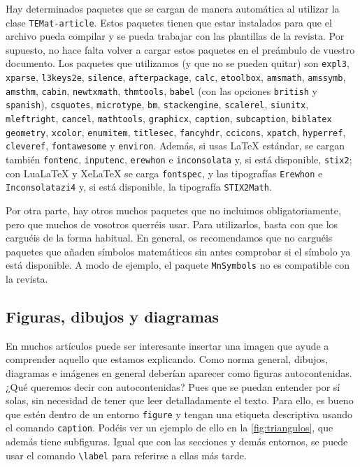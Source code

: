 \documentclass{TEMat-article}
\begin{document}
Hay determinados paquetes que se cargan de manera automática al utilizar la clase \verb+TEMat-article+.
Estos paquetes tienen que estar instalados para que el archivo pueda compilar y se pueda trabajar con las plantillas de la revista.
Por supuesto, no hace falta volver a cargar estos paquetes en el preámbulo de vuestro documento.
Los paquetes que utilizamos (y que no se pueden quitar) son \verb+expl3+, \verb+xparse+, \verb+l3keys2e+, \verb+silence+, \verb+afterpackage+, \verb+calc+, \verb+etoolbox+, \verb+amsmath+, \verb+amssymb+, \verb+amsthm+, \verb+cabin+, \verb+newtxmath+,  \verb+thmtools+, \verb+babel+ (con las opciones \verb+british+ y \verb+spanish+), \verb+csquotes+, \verb+microtype+, \verb+bm+, \verb+stackengine+, \verb+scalerel+, \verb+siunitx+, \verb+mleftright+, \verb+cancel+, \verb+mathtools+, \verb+graphicx+, \verb+caption+, \verb+subcaption+, \verb+biblatex+ \verb+geometry+, \verb+xcolor+, \verb+enumitem+, \verb+titlesec+, \verb+fancyhdr+, \verb+ccicons+, \verb+xpatch+, \verb+hyperref+, \verb+cleveref+, \verb+fontawesome+ y \verb+environ+.
Además, si usas LaTeX estándar, se cargan también \verb+fontenc+, \verb+inputenc+, \verb+erewhon+ e \verb+inconsolata+ y, si está disponible, \verb+stix2+; con LuaLaTeX y XeLaTeX se carga \verb+fontspec+, y las tipografías \verb+Erewhon+ e \verb+Inconsolatazi4+  y, si está disponible, la tipografía \verb+STIX2Math+.

Por otra parte, hay otros muchos paquetes que no incluimos obligatoriamente, pero que muchos de vosotros querréis usar.
Para utilizarlos, basta con que los carguéis de la forma habitual.
En general, os recomendamos que no carguéis paquetes que añaden símbolos matemáticos sin antes comprobar si el símbolo ya está disponible.
A modo de ejemplo, el paquete \verb+MnSymbols+ no es compatible con la revista.

\subsection{Figuras, dibujos y diagramas}\label{sec:diagramas}
En muchos artículos puede ser interesante insertar una imagen que ayude a comprender aquello que estamos explicando.
Como norma general, dibujos, diagramas e imágenes en general deberían aparecer como figuras autocontenidas.
¿Qué queremos decir con autocontenidas?
Pues que se puedan entender por sí solas, sin necesidad de tener que leer detalladamente el texto.
Para ello, es bueno que estén dentro de un entorno \verb+figure+ y tengan una etiqueta descriptiva usando el comando \verb+caption+.
Podéis ver un ejemplo de ello en la \cref{fig:triangulos}, que además tiene subfiguras.
Igual que con las secciones y demás entornos, se puede usar el comando \verb+\label+ para referirse a ellas más tarde.
\end{document}
